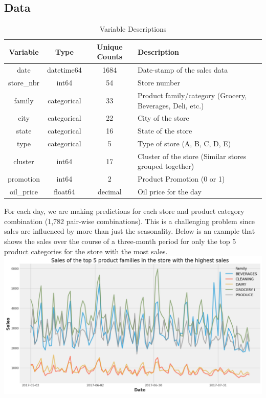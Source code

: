 \documentclass[12pt]{article}
\begin{document}
\subsection{Data}
\begin{table}[H]
\centering
\begin{tabular}{|c|c|c|p{7cm}|}
\hline
\textbf{Variable} & \textbf{Type} & \textbf{Unique Counts} & \textbf{Description} \\ \hline
date & datetime64 & 1684 & Date-stamp of the sales data \\ \hline
store\_nbr & int64 & 54 & Store number \\ \hline
family & categorical & 33 & Product family/category (Grocery, Beverages, Deli, etc.) \\ \hline
city & categorical & 22 & City of the store \\ \hline
state & categorical & 16 & State of the store \\ \hline
type & categorical & 5 & Type of store (A, B, C, D, E) \\ \hline
cluster & int64 & 17 & Cluster of the store (Similar stores grouped together) \\ \hline
promotion & int64 & 2 & Product Promotion (0 or 1) \\ \hline
oil\_price & float64 & decimal & Oil price for the day \\ \hline
\end{tabular}
\caption{Variable Descriptions}
\end{table}
For each day, we are making predictions for each store and product category combination (1,782 pair-wise combinations).
This is a challenging problem since sales are influenced by more than just the seasonality.
Below is an example that shows the sales over the course of a three-month period for only the top 5 product categories for the store with the most sales.
\\
\includegraphics[width=\textwidth]{figures/Top 5 Products.png}
\end{document}
